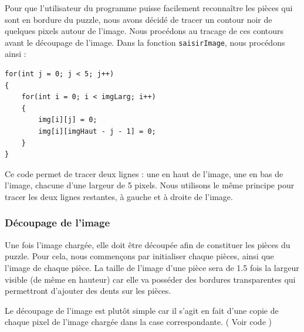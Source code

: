 \documentclass[]{article}
\newcommand{\variable}[1]{\noindent \texttt{#1}}
\begin{document}
Pour que l'utilisateur du programme puisse facilement reconnaître les pièces qui sont en bordure du puzzle, nous avons décidé de tracer un contour noir de quelques pixels autour de l'image. Nous procédons au tracage de ces contours avant le découpage de l'image. Dans la fonction \variable{saisirImage}, nous procédons ainsi :

\begin{lstlisting}
for(int j = 0; j < 5; j++)
{
    for(int i = 0; i < imgLarg; i++)
    {
        img[i][j] = 0;
        img[i][imgHaut - j - 1] = 0;
    }
}
\end{lstlisting}

Ce code permet de tracer deux lignes : une en haut de l'image, une en bas de l'image, chacune d'une largeur de 5 pixels. Nous utilisons le même principe pour tracer les deux lignes restantes, à gauche et à droite de l'image.

\subsubsection{Découpage de l'image}

Une fois l'image chargée, elle doit être découpée afin de constituer les pièces du puzzle. Pour cela, nous commençons par initialiser chaque pièces, ainsi que l'image de chaque pièce. La taille de l'image d'une pièce sera de 1.5 fois la largeur visible (de même en hauteur) car elle va posséder des bordures transparentes qui permettront d'ajouter des dents sur les pièces.

Le découpage de l'image est plutôt simple car il s'agit en fait d'une copie de chaque pixel de l'image chargée dans la case correspondante. ( Voir code )
\end{document}
